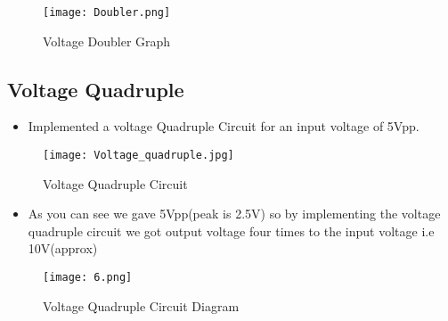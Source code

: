 \documentclass[9pt,conference]{IEEEtran}
\begin{document}
\begin{figure}[H]
    \centering
    \texttt{[image: Doubler.png]}
    \caption{Voltage Doubler Graph}
    \label{fig:positive_clamper}
\end{figure}


\subsection{Voltage Quadruple}
\begin{itemize}
    \item Implemented a voltage Quadruple Circuit for an input voltage of 5Vpp.
\end{itemize}
\begin{figure}[H]
    \centering
    \texttt{[image: Voltage\_quadruple.jpg]}
    \caption{Voltage Quadruple Circuit}
    \label{fig:negative_clamper}
\end{figure}

\begin{itemize}
    \item As you can see we gave 5Vpp(peak is 2.5V) so by implementing the voltage quadruple circuit we got output voltage four times to the input voltage i.e 10V(approx)
\end{itemize}
\begin{figure}[H]
    \centering
    \texttt{[image: 6.png]}
    \caption{Voltage Quadruple Circuit Diagram}
    \label{fig:positive_clamper}
\end{figure}
\end{document}
